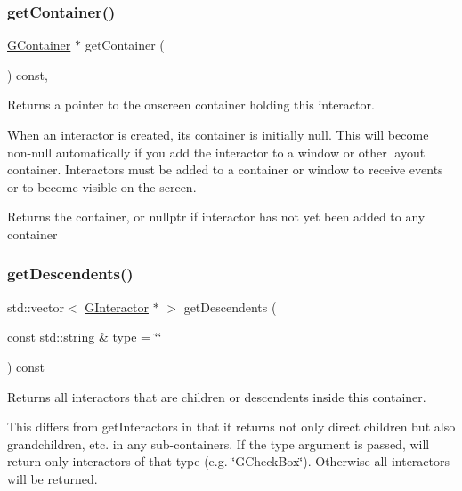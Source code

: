 \subsubsection{\texorpdfstring{get\+Container()}{getContainer()}}
{\footnotesize\ttfamily \mbox{\hyperlink{classsgl_1_1GContainer}{G\+Container}} $\ast$ get\+Container (\begin{DoxyParamCaption}{ }\end{DoxyParamCaption}) const\hspace{0.3cm}{\ttfamily [virtual]}, {\ttfamily [inherited]}}



Returns a pointer to the onscreen container holding this interactor. 

When an interactor is created, its container is initially null. This will become non-\/null automatically if you add the interactor to a window or other layout container. Interactors must be added to a container or window to receive events or to become visible on the screen. \begin{DoxyReturn}{Returns}
the container, or nullptr if interactor has not yet been added to any container 
\end{DoxyReturn}
\mbox{\label{classsgl_1_1GContainer_a9580b7f6ee0dc339f75bafd4e319f3ad}} 
\subsubsection{\texorpdfstring{get\+Descendents()}{getDescendents()}}
{\footnotesize\ttfamily std\+::vector$<$ \mbox{\hyperlink{classsgl_1_1GInteractor}{G\+Interactor}} $\ast$ $>$ get\+Descendents (\begin{DoxyParamCaption}\item[{const std\+::string \&}]{type = {\ttfamily \char`\"{}\char`\"{}} }\end{DoxyParamCaption}) const\hspace{0.3cm}{\ttfamily [virtual]}}



Returns all interactors that are children or descendents inside this container. 

This differs from get\+Interactors in that it returns not only direct children but also grandchildren, etc. in any sub-\/containers. If the type argument is passed, will return only interactors of that type (e.\+g. \char`\"{}\+G\+Check\+Box\char`\"{}). Otherwise all interactors will be returned. \mbox{\label{classsgl_1_1GInteractor_a894a5502900794eeb27d084c21f1d77d}} 
